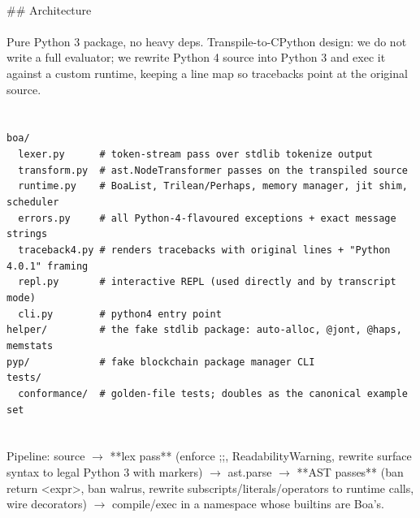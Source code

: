 \begin{exbox}
{  \  \\
  \#\# Architecture \\
  \  \\
  Pure Python 3 package, no heavy deps. Transpile-to-CPython design: we do not write a full evaluator; we rewrite Python 4 source into Python 3 and exec it against a custom runtime, keeping a line map so tracebacks point at the original source. \\
  \  \\
  \textasciigrave{}\textasciigrave{}\textasciigrave{} \\
  \textup{\texttt{boa/}} \\
  \textup{\texttt{~~lexer.py~~~~~~\# token-stream pass over stdlib \textasciigrave{}tokenize\textasciigrave{} output}} \\
  \textup{\texttt{~~transform.py~~\# ast.NodeTransformer passes on the transpiled source}} \\
  \textup{\texttt{~~runtime.py~~~~\# BoaList, Trilean/Perhaps, memory manager, jit shim, scheduler}} \\
  \textup{\texttt{~~errors.py~~~~~\# all Python-4-flavoured exceptions + exact message strings}} \\
  \textup{\texttt{~~traceback4.py \# renders tracebacks with original lines + "Python 4.0.1" framing}} \\
  \textup{\texttt{~~repl.py~~~~~~~\# interactive REPL (used directly and by transcript mode)}} \\
  \textup{\texttt{~~cli.py~~~~~~~~\# \textasciigrave{}python4\textasciigrave{} entry point}} \\
  \textup{\texttt{helper/~~~~~~~~~\# the fake stdlib package: auto-alloc, @jont, @haps, memstats}} \\
  \textup{\texttt{pyp/~~~~~~~~~~~~\# fake blockchain package manager CLI}} \\
  \textup{\texttt{tests/}} \\
  \textup{\texttt{~~conformance/~~\# golden-file tests; doubles as the canonical example set}} \\
  \textasciigrave{}\textasciigrave{}\textasciigrave{} \\
  \  \\
  Pipeline: source $\rightarrow$ **lex pass** (enforce \textasciigrave{};;\textasciigrave{}, ReadabilityWarning, rewrite surface syntax to legal Python 3 with markers) $\rightarrow$ \textasciigrave{}ast.parse\textasciigrave{} $\rightarrow$ **AST passes** (ban \textasciigrave{}return \textless{}expr\textgreater{}\textasciigrave{}, ban walrus, rewrite subscripts/literals/operators to runtime calls, wire decorators) $\rightarrow$ \textasciigrave{}compile\textasciigrave{}/\textasciigrave{}exec\textasciigrave{} in a namespace whose builtins are Boa's. \\
}
\end{exbox}
